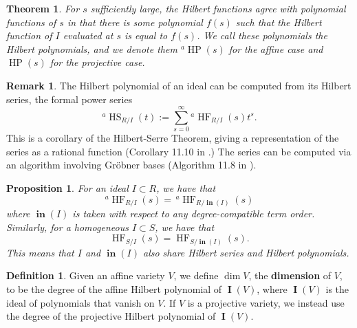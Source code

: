 \documentclass[11pt]{article}
\DeclareMathOperator{\Init}{\mathbf{in}}
\DeclareMathOperator{\HF}{HF}
\DeclareMathOperator{\HP}{HP}
\DeclareMathOperator{\HS}{HS}
\DeclareMathOperator{\I}{\mathbf{I}}
\newtheorem{theorem}{Theorem}
\newtheorem{proposition}{Proposition}
\theoremstyle{definition}
\newtheorem{definition}{Definition}
\newtheorem{remark}{Remark}
\begin{document}
\begin{theorem}
	For $s$ sufficiently large, the Hilbert functions agree with polynomial functions of $s$ in that there is some polynomial $f(s)$ such that the Hilbert function of $I$ evaluated at $s$ is equal to $f(s)$. We call these polynomials the Hilbert polynomials, and we denote them $^a\HP(s)$ for the affine case and $\HP(s)$ for the projective case.
\end{theorem}


\begin{remark}
	The Hilbert polynomial of an ideal can be computed from its Hilbert series, the formal power series \[ ^a\HS_{R/I}(t) := \sum_{s = 0}^\infty {}^a\HF_{R/I} (s) t^s. \] This is a corollary of the Hilbert-Serre Theorem, giving a representation of the series as a rational function (Corollary 11.10 in \cite{kemper2011course}.) The series can be computed via an algorithm involving Gröbner bases (Algorithm 11.8 in \cite{kemper2011course}). 
\end{remark}


\begin{proposition}
	For an ideal $I \subset R$, we have that \[ ^a\HF_{R/I}(s) = \, ^a\HF_{R/\Init(I)}(s) \] where $\Init(I)$ is taken with respect to any degree-compatible term order. Similarly, for a homogeneous $I \subset S$, we have that \[ \HF_{S/I}(s) = \HF_{S/\Init(I)}(s). \] This means that $I$ and $\Init(I)$ also share Hilbert series and Hilbert polynomials. 
\end{proposition}


\begin{definition}
	Given an affine variety $V$, we define $\dim V$, the \textbf{dimension} of $V$, to be the degree of the affine Hilbert polynomial of $\I(V)$, where $\I(V)$ is the ideal of polynomials that vanish on $V$. If $V$ is a projective variety, we instead use the degree of the projective Hilbert polynomial of $\I(V)$. 
\end{definition}
\end{document}
